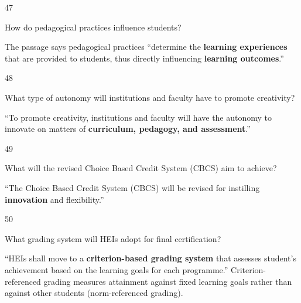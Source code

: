 \begin{question}{47}
{How do pedagogical practices influence students?\par}
\begin{explain}
The passage says pedagogical practices ``determine the \textbf{learning experiences} that are provided to students, thus directly influencing \textbf{learning outcomes}.''
\end{explain}
\end{question}

\begin{question}{48}
{What type of autonomy will institutions and faculty have to promote creativity?\par}
\begin{explain}
``To promote creativity, institutions and faculty will have the autonomy to innovate on matters of \textbf{curriculum, pedagogy, and assessment}.''
\end{explain}
\end{question}

\begin{question}{49}
{What will the revised Choice Based Credit System (CBCS) aim to achieve?\par}
\begin{explain}
``The Choice Based Credit System (CBCS) will be revised for instilling \textbf{innovation} and flexibility.''
\end{explain}
\end{question}

\begin{question}{50}
{What grading system will HEIs adopt for final certification?\par}
\begin{explain}
``HEIs shall move to a \textbf{criterion-based grading system} that assesses student's achievement based on the learning goals for each programme.'' Criterion-referenced grading measures attainment against fixed learning goals rather than against other students (norm-referenced grading).
\end{explain}
\end{question}
